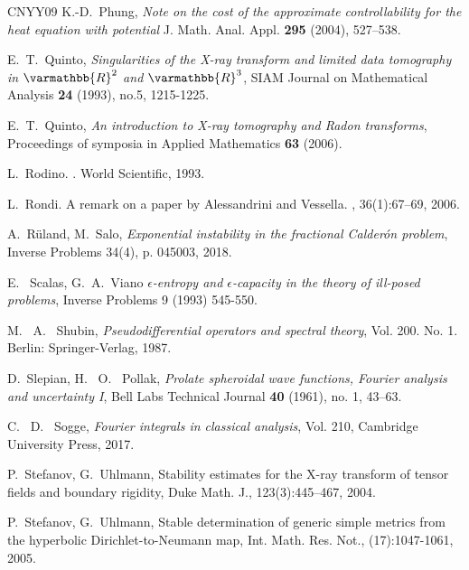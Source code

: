 \documentclass[12pt,twoside]{amsart}
\numberwithin{equation}{section}
\renewcommand{\mathbb}{\varmathbb}
\newcommand {\R} {\mathbb{R}} \newcommand {\Z} {\mathbb{Z}}
\begin{document}
\begin{thebibliography}{CNYY09}
K.-D.\ Phung, 
\textit{{Note on the cost of the approximate controllability for the heat equation with potential}}
J. Math. Anal. Appl. {\bf 295} (2004), 527--538.



E.\ T.\ Quinto, \textit{{Singularities of the X-ray transform and limited data tomography in $\R^{2}$ and $\R^{3}$}},
SIAM Journal on Mathematical Analysis
{\bf 24} (1993), no.5, 1215-1225.

E.\ T.\ Quinto, \textit{{An introduction to X-ray tomography and Radon transforms}},
Proceedings of symposia in Applied Mathematics
{\bf 63} (2006).


L.\ Rodino.
.
\newblock World Scientific, 1993.

L.\ Rondi.
\newblock A remark on a paper by Alessandrini and Vessella.
, 36(1):67--69, 2006.


A.\ R{\"u}land, M.\ Salo, \textit{{Exponential instability in the fractional Calder\'on problem}}, Inverse Problems 34(4), p. 045003, 2018.


E. \ Scalas, G.\ A.\ Viano \textit{{$\epsilon$-entropy and $\epsilon$-capacity in the theory of ill-posed problems}}, Inverse Problems 9 (1993) 545-550.

M. \ A. \ Shubin, \textit{{Pseudodifferential operators and spectral theory}}, Vol. 200. No. 1. Berlin: Springer-Verlag, 1987.

D.\ Slepian, H. \ O. \ Pollak, \textit{{Prolate spheroidal wave functions, Fourier analysis and uncertainty I}}, Bell Labs Technical Journal {\bf 40} (1961), no. 1, 43--63.

C. \ D. \ Sogge, \textit{{Fourier integrals in classical analysis}}, Vol. 210, Cambridge University Press, 2017. 


P.\ Stefanov, G.\ Uhlmann, Stability estimates for the X-ray transform of tensor fields and boundary rigidity,  Duke Math. J., 123(3):445--467, 2004.

P.\ Stefanov, G.\ Uhlmann, Stable determination of generic simple metrics from the hyperbolic Dirichlet-to-Neumann map, Int. Math. Res. Not., (17):1047-1061, 2005.


\end{thebibliography}
\end{document}
